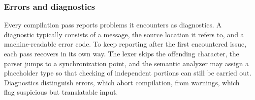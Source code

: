 \subsubsection{Errors and diagnostics}

Every compilation pass reports problems it encounters as diagnostics.
A diagnostic typically consists of a message, the source location it refers to,
and a machine-readable error code.
To keep reporting after the first encountered issue, each pass recovers in its own way.
The lexer skips the offending character, the parser jumps to a synchronization point,
and the semantic analyzer may assign a placeholder type
so that checking of independent portions can still be carried out.
Diagnostics distinguish errors, which abort compilation,
from warnings, which flag suspicious but translatable input.
